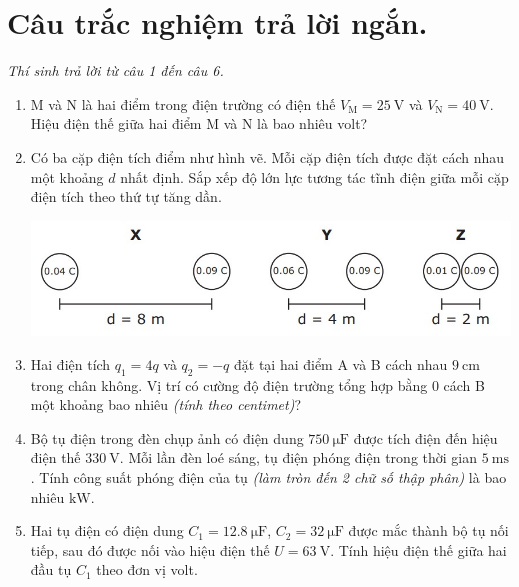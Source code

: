 \section{Câu trắc nghiệm trả lời ngắn.} \textit{Thí sinh trả lời từ câu 1 đến câu 6.}
\begin{enumerate}[label=\bfseries Câu \arabic*:]
	\item M và N là hai điểm trong điện trường có điện thế $V_\text{M}=\SI{25}{\volt}$ và $V_\text{N}=\SI{40}{\volt}$. Hiệu điện thế giữa hai điểm M và N là bao nhiêu volt?
	
	\item Có ba cặp điện tích điểm như hình vẽ. Mỗi cặp điện tích được đặt cách nhau một khoảng $d$ nhất định. Sắp xếp độ lớn lực tương tác tĩnh điện giữa mỗi cặp điện tích theo thứ tự tăng dần.
	\begin{center}
		\includegraphics[width=0.8\linewidth]{../figs/PH11-MidSem2-01-4}
	\end{center}



\item Hai điện tích $q_1=4q$ và $q_2=-q$ đặt tại hai điểm A và B cách nhau $\SI{9}{\centi\meter}$ trong chân không. Vị trí có cường độ điện trường tổng hợp bằng 0 cách B một khoảng bao nhiêu \textit{(tính theo centimet)}?

\item Bộ tụ điện trong đèn chụp ảnh có điện dung $\SI{750}{\micro\farad}$ được tích điện đến hiệu điện thế $\SI{330}{\volt}$. Mỗi lần đèn loé sáng, tụ điện phóng điện trong thời gian $\SI{5}{\milli\second}$. Tính công suất phóng điện của tụ \textit{(làm tròn đến 2 chữ số thập phân)} là bao nhiêu $\si{\kilo\watt}$.

\item Hai tụ điện có điện dung $C_1=\SI{12.8}{\micro\farad}$, $C_2=\SI{32}{\micro\farad}$ được mắc thành bộ tụ nối tiếp, sau đó được nối vào hiệu điện thế $U=\SI{63}{\volt}$. Tính hiệu điện thế giữa hai đầu tụ $C_1$ theo đơn vị volt.


\end{enumerate}
